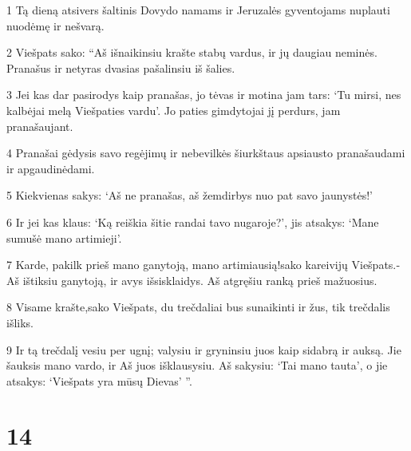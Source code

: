 \par 1 Tą dieną atsivers šaltinis Dovydo namams ir Jeruzalės gyventojams nuplauti nuodėmę ir nešvarą. 
\par 2 Viešpats sako: “Aš išnaikinsiu krašte stabų vardus, ir jų daugiau neminės. Pranašus ir netyras dvasias pašalinsiu iš šalies. 
\par 3 Jei kas dar pasirodys kaip pranašas, jo tėvas ir motina jam tars: ‘Tu mirsi, nes kalbėjai melą Viešpaties vardu’. Jo paties gimdytojai jį perdurs, jam pranašaujant. 
\par 4 Pranašai gėdysis savo regėjimų ir nebevilkės šiurkštaus apsiausto pranašaudami ir apgaudinėdami. 
\par 5 Kiekvienas sakys: ‘Aš ne pranašas, aš žemdirbys nuo pat savo jaunystės!’ 
\par 6 Ir jei kas klaus: ‘Ką reiškia šitie randai tavo nugaroje?’, jis atsakys: ‘Mane sumušė mano artimieji’. 
\par 7 Karde, pakilk prieš mano ganytoją, mano artimiausią!­sako kareivijų Viešpats.­Aš ištiksiu ganytoją, ir avys išsisklaidys. Aš atgręšiu ranką prieš mažuosius. 
\par 8 Visame krašte,­sako Viešpats,­ du trečdaliai bus sunaikinti ir žus, tik trečdalis išliks. 
\par 9 Ir tą trečdalį vesiu per ugnį; valysiu ir gryninsiu juos kaip sidabrą ir auksą. Jie šauksis mano vardo, ir Aš juos išklausysiu. Aš sakysiu: ‘Tai mano tauta’, o jie atsakys: ‘Viešpats yra mūsų Dievas’ ”.



\chapter{14}


